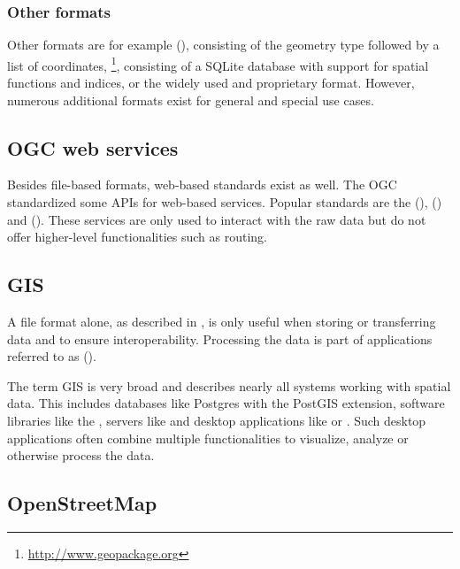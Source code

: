 		\subsubsection{Other formats}
		\label{subsubsec:other-formats}
		
			Other formats are for example  (), consisting of the geometry type followed by a list of coordinates\cite[51]{ogc-sfa}, \footnote{\url{http://www.geopackage.org}}, consisting of a SQLite database with support for spatial functions and indices, or the widely used and proprietary  format\cite{esri-shapefile-spec}.
			However, numerous additional formats exist for general and special use cases.
			
	\subsection{OGC web services}
	
		Besides file-based formats, web-based standards exist as well.
		The OGC standardized some APIs for web-based services.
		Popular standards are the  (),  () and  ().
		These services are only used to interact with the raw data but do not offer higher-level functionalities such as routing.
	
	\subsection{GIS}
	
		A file format alone, as described in , is only useful when storing or transferring data and to ensure interoperability.
		Processing the data is part of applications referred to as  ().
		
		The term GIS is very broad and describes nearly all systems working with spatial data.
		This includes databases like Postgres with the PostGIS extension, software libraries like the , servers like  and desktop applications like  or .
		Such desktop applications often combine multiple functionalities to visualize, analyze or otherwise process the data.
	
	\subsection{OpenStreetMap}
	\label{subsec:osm}
	

